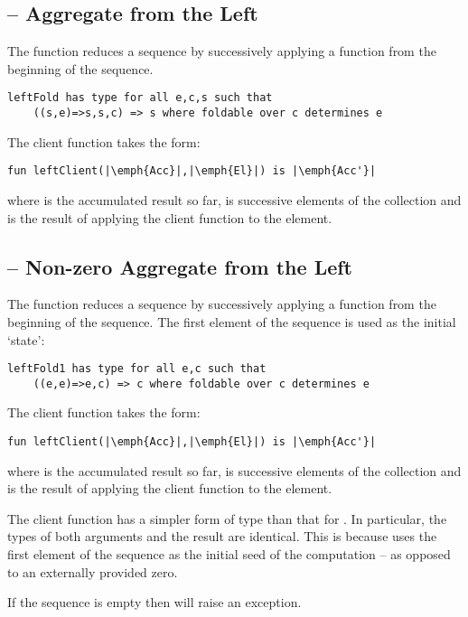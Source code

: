 \subsection{ -- Aggregate from the Left}
\label{leftFold}
The  function reduces a sequence by successively applying a function from the beginning of the sequence.
\begin{lstlisting}
leftFold has type for all e,c,s such that
    ((s,e)=>s,s,c) => s where foldable over c determines e
\end{lstlisting}
The client function takes the form:
\begin{lstlisting}[escapechar=|]
fun leftClient(|\emph{Acc}|,|\emph{El}|) is |\emph{Acc'}|
\end{lstlisting}
where  is the accumulated result so far,  is successive elements of the collection and  is the result of applying the client function to the element.

\subsection{ -- Non-zero Aggregate from the Left}
\label{leftFold1}
The  function reduces a sequence by successively applying a function from the beginning of the sequence. The first element of the sequence is used as the initial `state':
\begin{lstlisting}
leftFold1 has type for all e,c such that
    ((e,e)=>e,c) => c where foldable over c determines e
\end{lstlisting}
The client function takes the form:
\begin{lstlisting}[escapechar=|]
fun leftClient(|\emph{Acc}|,|\emph{El}|) is |\emph{Acc'}|
\end{lstlisting}
where  is the accumulated result so far,  is successive elements of the collection and  is the result of applying the client function to the element.

\begin{aside}
The client function has a simpler form of type than that for . In particular, the types of both arguments and the result are identical. This is because  uses the first element of the sequence as the initial seed of the computation -- as opposed to an externally provided zero.
\end{aside}

\begin{aside}
If the sequence is empty then  will raise an exception.
\end{aside}

